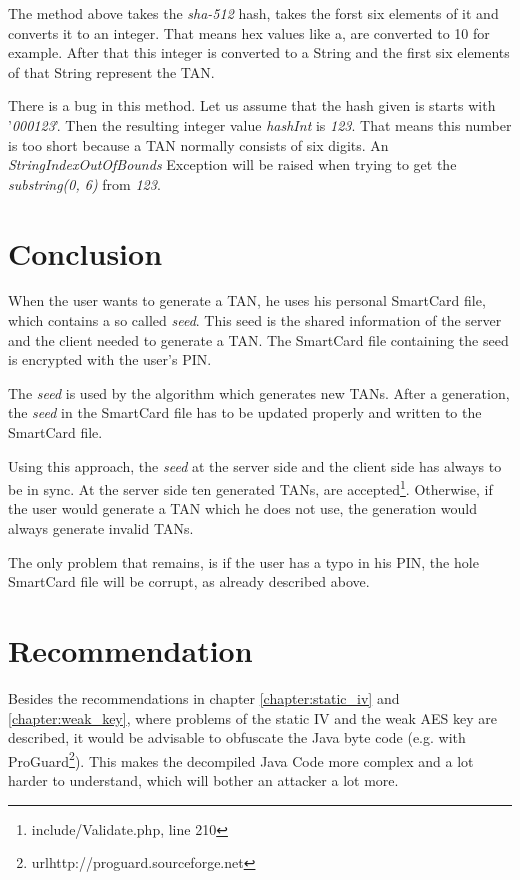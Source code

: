 The method above takes the \textit{sha-512} hash, takes the forst six elements of it and converts it to an integer. That means hex values like a, are converted to 10 for example. After that this integer is converted to a String and the first six elements of that String represent the TAN.

There is a bug in this method. Let us assume that the hash given is starts with '\textit{000123}'. Then the resulting integer value \textit{hashInt} is \textit{123}. That means this number is too short because a TAN normally consists of six digits. An \textit{StringIndexOutOfBounds} Exception will be raised when trying to get the \textit{substring(0, 6)} from \textit{123}.

\section{Conclusion}

When the user wants to generate a TAN, he uses his personal SmartCard file, which contains a so called \textit{seed}. This seed is the shared information of the server and the client needed to generate a TAN. The SmartCard file containing the seed is encrypted with the user's PIN.

The \textit{seed} is used by the algorithm which generates new TANs. After a generation, the \textit{seed} in the SmartCard file has to be updated properly and written to the SmartCard file.

Using this approach, the \textit{seed} at the server side and the client side has always to be in sync. At the server side ten generated TANs, are accepted\footnote{include/Validate.php, line 210}. Otherwise, if the user would generate a TAN which he does not use, the generation would always generate invalid TANs.

The only problem that remains, is if the user has a typo in his PIN, the hole SmartCard file will be corrupt, as already described above.

\section{Recommendation}

Besides the recommendations in chapter \ref{chapter:static_iv} and \ref{chapter:weak_key}, where problems of the static IV and the weak AES key are described, it would be advisable to obfuscate the Java byte code (e.g. with ProGuard\footnote{url{http://proguard.sourceforge.net}}). This makes the decompiled Java Code more complex and a lot harder to understand, which will bother an attacker a lot more.